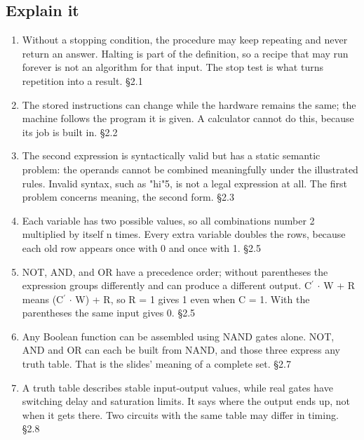 \documentclass[11pt]{article}
\begin{document}
\begin{keepsection}\subsection{Explain it}

\begin{enumerate}
\item Without a stopping condition, the procedure may keep repeating and never return an answer. Halting is part of the definition, so a recipe that may run forever is not an algorithm for that input. The stop test is what turns repetition into a result. \hfill{\small\color{FAUblue}§2.1}
\item The stored instructions can change while the hardware remains the same; the machine follows the program it is given. A calculator cannot do this, because its job is built in. \hfill{\small\color{FAUblue}§2.2}
\item The second expression is syntactically valid but has a static semantic problem: the operands cannot be combined meaningfully under the illustrated rules. Invalid syntax, such as "hi"5, is not a legal expression at all. The first problem concerns meaning, the second form. \hfill{\small\color{FAUblue}§2.3}
\item Each variable has two possible values, so all combinations number 2 multiplied by itself n times. Every extra variable doubles the rows, because each old row appears once with 0 and once with 1. \hfill{\small\color{FAUblue}§2.5}
\item NOT, AND, and OR have a precedence order; without parentheses the expression groups differently and can produce a different output. C\ensuremath{{}^{\prime}} \ensuremath{\cdot} W + R means (C\ensuremath{{}^{\prime}} \ensuremath{\cdot} W) + R, so R = 1 gives 1 even when C = 1. With the parentheses the same input gives 0. \hfill{\small\color{FAUblue}§2.5}
\item Any Boolean function can be assembled using NAND gates alone. NOT, AND and OR can each be built from NAND, and those three express any truth table. That is the slides' meaning of a complete set. \hfill{\small\color{FAUblue}§2.7}
\item A truth table describes stable input-output values, while real gates have switching delay and saturation limits. It says where the output ends up, not when it gets there. Two circuits with the same table may differ in timing. \hfill{\small\color{FAUblue}§2.8}
\end{enumerate}

\end{keepsection}
\end{document}
